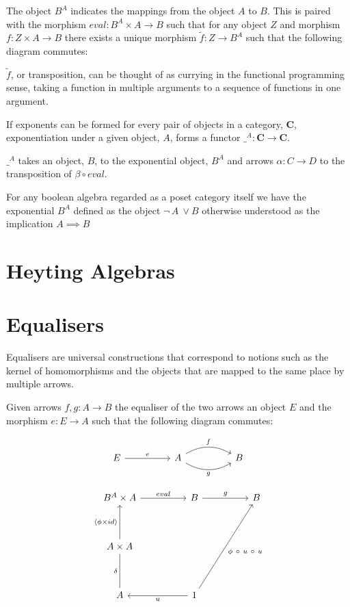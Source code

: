 \documentclass[a4paper,12pt]{article}
\begin{document}
The object $B^{A}$ indicates the mappings from the object $A$ to $B$. This is
paired with the morphism $eval: B^{A} \times A \rightarrow B$ such that for any
object $Z$ and morphism $f : Z\times A \rightarrow B$ there exists a unique
morphism $\tilde{f}: Z \rightarrow B^{A}$ such that the following diagram
commutes:


$\tilde{f}$, or transposition, can be thought of as currying in the functional
programming sense, taking a function in multiple arguments to a sequence of
functions in one argument.

If exponents can be formed for every pair of objects in a category, \textbf{C},
exponentiation under a given object, $A$, forms a functor $\_^{A}: \textbf{C}
\rightarrow \textbf{C}$.

$\_^{A}$ takes an object, $B$, to the exponential object, $B^{A}$ and arrows
$\alpha: C \rightarrow D$ to the transposition of $\beta \circ eval$.

For any boolean algebra regarded as a poset category itself we have the
exponential $B^{A}$ defined as the object $\neg \, A \ \lor B$ otherwise
understood as the implication $A \implies B$
\section{Heyting Algebras}
\section{Equalisers}
Equalisers are universal constructions that correspond to notions such as the
kernel of homomorphisms and the objects that are mapped to the same place by
multiple arrows.

Given arrows $f, g : A \rightarrow B $ the equaliser of the two arrows an object
$E$ and the morphism $e: E \rightarrow A$ such that the following diagram
commutes:

\[\begin{tikzcd}[sep=huge]
    E \arrow[r, "e"] & A \arrow[r, "f", bend left] \arrow[r, "g"', bend right] &
    B
\end{tikzcd}\]

\[\begin{tikzcd}[sep=huge]
    B^A \times A \arrow[r, "eval"]                         & B \arrow[r, "g"]
    & B \\
    A \times A \arrow[u, "\langle \phi \times id \rangle"] &
    &   \\
    A \arrow[u, "\delta", no head]                         & 1 \arrow[l, "u"]
    \arrow[ruu, "\phi \ \circ \ u \ \circ \ u"'] &  
\end{tikzcd}\]
\end{document}
